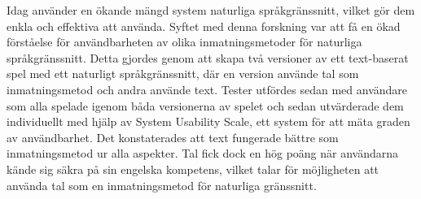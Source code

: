 Idag använder en ökande mängd system naturliga språkgränssnitt, vilket gör dem enkla och effektiva att använda. Syftet med denna forskning var att få en ökad förståelse för användbarheten av olika inmatningsmetoder för naturliga språkgränssnitt. Detta gjordes genom att skapa två versioner av ett text-baserat spel med ett naturligt språkgränssnitt, där en version använde tal som inmatningsmetod och andra använde text. Tester utfördes sedan med användare som alla spelade igenom båda versionerna av spelet och sedan utvärderade dem individuellt med hjälp av System Usability Scale, ett system för att mäta graden av användbarhet. Det konstaterades att text fungerade bättre som inmatningsmetod ur alla aspekter. Tal fick dock en hög poäng när användarna kände sig säkra på sin engelska kompetens, vilket talar för möjligheten att använda tal som en inmatningsmetod för naturliga gränssnitt.